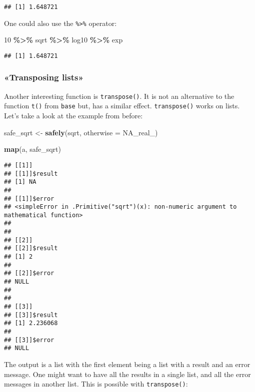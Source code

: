 \documentclass[
]{article}
\newenvironment{Shaded}{\begin{snugshade}}{\end{snugshade}}
\newcommand{\DataTypeTok}[1]{\textcolor[rgb]{0.13,0.29,0.53}{#1}}
\newcommand{\DecValTok}[1]{\textcolor[rgb]{0.00,0.00,0.81}{#1}}
\newcommand{\KeywordTok}[1]{\textcolor[rgb]{0.13,0.29,0.53}{\textbf{#1}}}
\newcommand{\NormalTok}[1]{#1}
\newcommand{\OperatorTok}[1]{\textcolor[rgb]{0.81,0.36,0.00}{\textbf{#1}}}
\newcommand{\OtherTok}[1]{\textcolor[rgb]{0.56,0.35,0.01}{#1}}
\newcommand{\StringTok}[1]{\textcolor[rgb]{0.31,0.60,0.02}{#1}}
\begin{document}
\begin{verbatim}
## [1] 1.648721
\end{verbatim}

One could also use the \texttt{\%\textgreater{}\%} operator:

\begin{Shaded}
\begin{Highlighting}[]
\DecValTok{10} \OperatorTok{\%\textgreater{}\%}
\StringTok{  }\NormalTok{sqrt }\OperatorTok{\%\textgreater{}\%}
\StringTok{  }\NormalTok{log10 }\OperatorTok{\%\textgreater{}\%}
\StringTok{  }\NormalTok{exp}
\end{Highlighting}
\end{Shaded}

\begin{verbatim}
## [1] 1.648721
\end{verbatim}

\hypertarget{transposing-lists}{%
\subsubsection{«Transposing lists»}\label{transposing-lists}}

Another interesting function is \texttt{transpose()}. It is not an alternative to the function \texttt{t()} from
\texttt{base} but, has a similar effect. \texttt{transpose()} works on lists. Let's take a look at the example
from before:

\begin{Shaded}
\begin{Highlighting}[]
\NormalTok{safe\_sqrt \textless{}{-}}\StringTok{ }\KeywordTok{safely}\NormalTok{(sqrt, }\DataTypeTok{otherwise =} \OtherTok{NA\_real\_}\NormalTok{)}

\KeywordTok{map}\NormalTok{(a, safe\_sqrt)}
\end{Highlighting}
\end{Shaded}

\begin{verbatim}
## [[1]]
## [[1]]$result
## [1] NA
## 
## [[1]]$error
## <simpleError in .Primitive("sqrt")(x): non-numeric argument to mathematical function>
## 
## 
## [[2]]
## [[2]]$result
## [1] 2
## 
## [[2]]$error
## NULL
## 
## 
## [[3]]
## [[3]]$result
## [1] 2.236068
## 
## [[3]]$error
## NULL
\end{verbatim}

The output is a list with the first element being a list with a result and an error message. One
might want to have all the results in a single list, and all the error messages in another list.
This is possible with \texttt{transpose()}:
\end{document}
